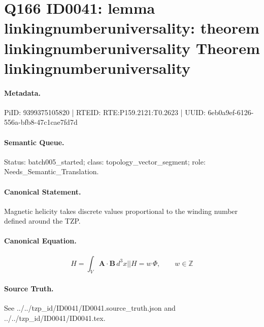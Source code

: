 \section*{Q166 ID0041: lemma linkingnumberuniversality: theorem linkingnumberuniversality Theorem linkingnumberuniversality}
\paragraph{Metadata.}
PiID: 9399375105820 | RTEID: RTE:P159.2121:T0.2623 | UUID: 6eb0a9ef-6126-556a-bfb8-47c1cae7fd7d

\paragraph{Semantic Queue.}
Status: batch005\_started; class: topology\_vector\_segment; role: Needs\_Semantic\_Translation.

\paragraph{Canonical Statement.}
Magnetic helicity takes discrete values proportional to the winding number defined around the TZP.

\paragraph{Canonical Equation.}
\[
H = \int_{V}\mathbf{A}\cdot\mathbf{B}\,d^{3}x || H = w\,\Phi, \qquad w \in \mathbb{Z}
\]

\paragraph{Source Truth.}
See ../../tzp\_id/ID0041/ID0041.source\_truth.json and ../../tzp\_id/ID0041/ID0041.tex.
